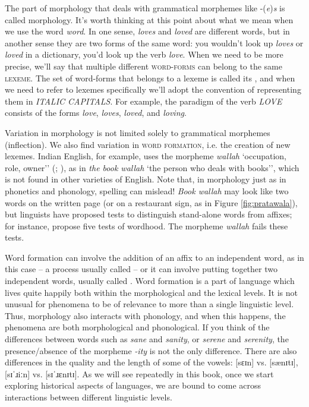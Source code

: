 The part of morphology that deals with grammatical morphemes like -(\emph{e})\emph{s} is called  morphology. It's worth thinking at this point about what we mean when we use the word \emph{word}. In one sense, \emph{loves} and \emph{loved} are different words, but in another sense they are two forms of the same word: you wouldn't look up \emph{loves} or \emph{loved} in a dictionary, you'd look up the verb \emph{love}. When we need to be more precise, we'll say that multiple different \textsc{word-forms} can belong to the same \textsc{lexeme}. The set of word-forms that belongs to a lexeme is called its , and when we need to refer to lexemes specifically we'll adopt the convention of representing them in \emph{ITALIC CAPITALS}. For example, the paradigm of the verb \emph{LOVE} consists of the forms \emph{love}, \emph{loves}, \emph{loved}, and \emph{loving}.

\largerpage[2]
Variation in morphology is not limited solely to grammatical morphemes (inflection). We also find variation in \textsc{word formation}, i.e. the creation of new lexemes. Indian English, for example, uses the morpheme \emph{wallah} `occupation, role, owner'' (\citealp[69]{Kachru1975}; \citealp[362]{Sailaja2012}), as in \emph{the book wallah} `the person who deals with books'', which is not found in other varieties of English. Note that, in morphology just as in phonetics and phonology, spelling can mislead! \emph{Book wallah} may look like two words on the written page (or on a restaurant sign, as in Figure \ref{fig:pratawala}), but linguists have proposed tests to distinguish stand-alone words from affixes; for instance, \citet{BresnanMchombo} propose five tests of wordhood. The morpheme \emph{wallah} fails these tests.

Word formation can involve the addition of an affix to an independent word, as in this case -- a process usually called  -- or it can involve putting together two independent words, usually called . Word formation is a part of language which lives quite happily both within the morphological and the lexical levels. It is not unusual for phenomena to be of relevance to more than a single linguistic level. Thus, morphology also interacts with phonology, and when this happens, the phenomena are both morphological and phonological. If you think of the differences between words such as \emph{sane} and \emph{sanity}, or \emph{serene} and \emph{serenity}, the presence/absence of the morpheme \emph{-ity} is not the only difference. There are also differences in the quality and the length of some of the vowels: [sɛɪn] vs. [sænɪtɪ], [sɪˈɹiːn] vs. [sɪˈɹɛnɪtɪ]. As we will see repeatedly in this book, once we start exploring historical aspects of languages, we are bound to come across interactions between different linguistic levels.


